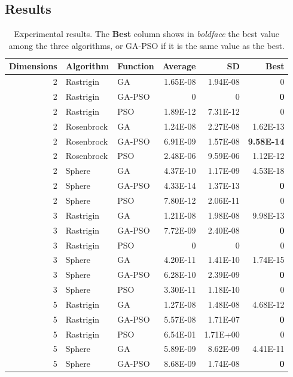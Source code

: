 \documentclass[runningheads]{llncs}
\begin{document}
\subsection{Results}
\label{subs:results}
%
\begin{table}[h!tp]
  \caption{Experimental results. The {\bf Best} column shows in {\em
      boldface} the best value among the three algorithms, or GA-PSO
    if it is the same value as the best.}
  \label{table:resultados}
  \centering
\begin{tabular}{rllrrr}
  \hline
Dimensions & Algorithm & Function & Average & SD & Best \\ 
  \hline
   2 & Rastrigin & GA & 1.65E-08 & 1.94E-08 & 0 \\ 
  2 & Rastrigin & GA-PSO & 0 & 0 & {\bf 0} \\ 
  2 & Rastrigin & PSO & 1.89E-12 & 7.31E-12 & 0 \\ 
  2 & Rosenbrock & GA & 1.24E-08 & 2.27E-08 & 1.62E-13 \\ 
  2 & Rosenbrock & GA-PSO & 6.91E-09 & 1.57E-08 & {\bf 9.58E-14} \\ 
  2 & Rosenbrock & PSO & 2.48E-06 & 9.59E-06 & 1.12E-12 \\ 
  2 & Sphere & GA & 4.37E-10 & 1.17E-09 & 4.53E-18 \\ 
  2 & Sphere & GA-PSO & 4.33E-14 & 1.37E-13 & {\bf 0 }\\ 
  2 & Sphere & PSO & 7.80E-12 & 2.06E-11 & 0 \\ 
  3 & Rastrigin & GA & 1.21E-08 & 1.98E-08 & 9.98E-13 \\ 
  3 & Rastrigin & GA-PSO & 7.72E-09 & 2.40E-08 & {\bf 0} \\ 
  3 & Rastrigin & PSO & 0 & 0 & 0 \\ 
  3 & Sphere & GA & 4.20E-11 & 1.41E-10 & 1.74E-15 \\ 
  3 & Sphere & GA-PSO & 6.28E-10 & 2.39E-09 & {\bf 0} \\ 
  3 & Sphere & PSO & 3.30E-11 & 1.18E-10 & 0 \\ 
  5 & Rastrigin & GA & 1.27E-08 & 1.48E-08 & 4.68E-12 \\ 
  5 & Rastrigin & GA-PSO & 5.57E-08 & 1.71E-07 & {\bf 0} \\ 
  5 & Rastrigin & PSO & 6.54E-01 & 1.71E+00 & 0 \\ 
  5 & Sphere & GA & 5.89E-09 & 8.62E-09 & 4.41E-11 \\ 
  5 & Sphere & GA-PSO & 8.68E-09 & 1.74E-08 & {\bf 0} \\ 

\end{tabular}
\end{table}
\end{document}
